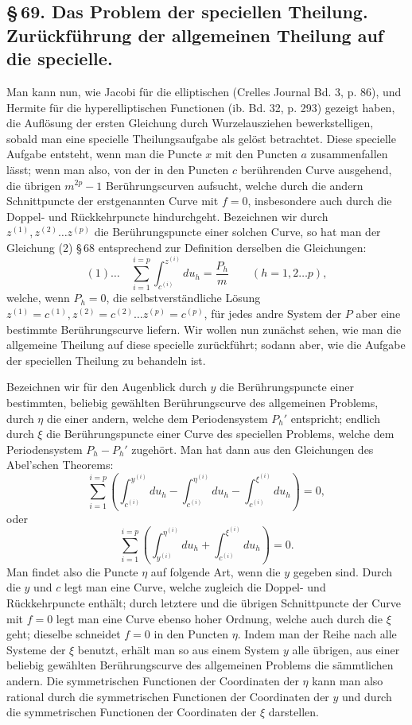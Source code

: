 \documentclass[10pt]{article}
\begin{document}
\subsection*{\S\,69. Das Problem der speciellen Theilung. Zurückführung der allgemeinen Theilung auf die specielle.}

Man kann nun, wie Jacobi für die elliptischen (Crelles Journal Bd. 3, p. 86), und Hermite für die hyperelliptischen Functionen (ib. Bd. 32, p. 293) gezeigt haben, die Auflösung der ersten Gleichung durch Wurzelausziehen bewerkstelligen, sobald man eine specielle Theilungsaufgabe als gelöst betrachtet. Diese specielle Aufgabe entsteht, wenn man die Puncte \(x\) mit den Puncten \(a\) zusammenfallen lässt; wenn man also, von der in den Puncten \(c\) berührenden Curve ausgehend, die übrigen \(m^{2p}-1\) Berührungscurven aufsucht, welche durch die andern Schnittpuncte der erstgenannten Curve mit \(f=0\), insbesondere auch durch die Doppel- und Rückkehrpuncte hindurchgeht. Bezeichnen wir durch \(z^{(1)},z^{(2)}\ldots z^{(p)}\) die Berührungspuncte einer solchen Curve, so hat man der Gleichung (2) \S\,68 entsprechend zur Definition derselben die Gleichungen:
\[
(1)\ldots\quad
\sum_{i=1}^{i=p}\int_{c^{(i)}}^{z^{(i)}}du_h=\frac{P_h}{m}
\qquad(h=1,2\ldots p),
\]
welche, wenn \(P_h=0\), die selbstverständliche Lösung \(z^{(1)}=c^{(1)},z^{(2)}=c^{(2)}\ldots z^{(p)}=c^{(p)}\), für jedes andre System der \(P\) aber eine bestimmte Berührungscurve liefern. Wir wollen nun zunächst sehen, wie man die allgemeine Theilung auf diese specielle zurückführt; sodann aber, wie die Aufgabe der speciellen Theilung zu behandeln ist.

Bezeichnen wir für den Augenblick durch \(y\) die Berührungspuncte einer bestimmten, beliebig gewählten Berührungscurve des allgemeinen Problems, durch \(\eta\) die einer andern, welche dem Periodensystem \(P_h'\) entspricht; endlich durch \(\xi\) die Berührungspuncte einer Curve des speciellen Problems, welche dem Periodensystem \(P_h-P_h'\) zugehört. Man hat dann aus den Gleichungen des Abel'schen Theorems:
\[
\sum_{i=1}^{i=p}\left(
\int_{c^{(i)}}^{y^{(i)}}du_h-
\int_{c^{(i)}}^{\eta^{(i)}}du_h-
\int_{c^{(i)}}^{\xi^{(i)}}du_h
\right)=0,
\]
oder
\[
\sum_{i=1}^{i=p}\left(
\int_{y^{(i)}}^{\eta^{(i)}}du_h+
\int_{c^{(i)}}^{\xi^{(i)}}du_h
\right)=0.
\]
Man findet also die Puncte \(\eta\) auf folgende Art, wenn die \(y\) gegeben sind. Durch die \(y\) und \(c\) legt man eine Curve, welche zugleich die Doppel- und Rückkehrpuncte enthält; durch letztere und die übrigen Schnittpuncte der Curve mit \(f=0\) legt man eine Curve ebenso hoher Ordnung, welche auch durch die \(\xi\) geht; dieselbe schneidet \(f=0\) in den Puncten \(\eta\). Indem man der Reihe nach alle Systeme der \(\xi\) benutzt, erhält man so aus einem System \(y\) alle übrigen, aus einer beliebig gewählten Berührungscurve des allgemeinen Problems die sämmtlichen andern. Die symmetrischen Functionen der Coordinaten der \(\eta\) kann man also rational durch die symmetrischen Functionen der Coordinaten der \(y\) und durch die symmetrischen Functionen der Coordinaten der \(\xi\) darstellen.
\end{document}
